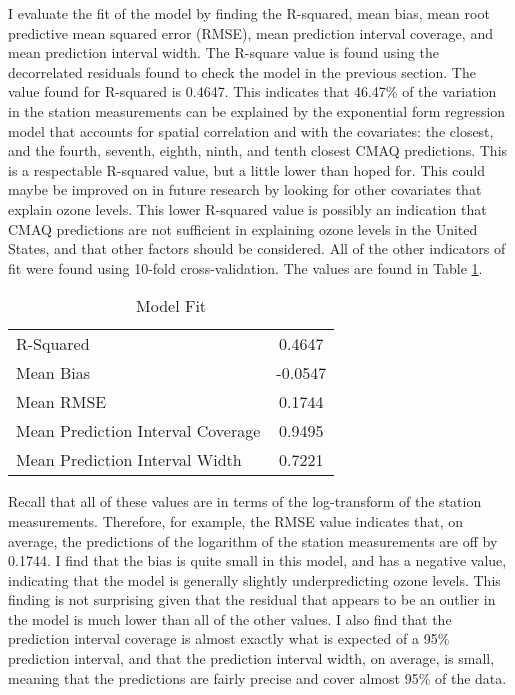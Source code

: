 \documentclass{svproc}
\begin{document}
I evaluate the fit of the model by finding the R-squared, mean bias, mean root predictive mean squared error (RMSE), mean prediction interval coverage, and mean prediction interval width. The R-square value is found using the decorrelated residuals found to check the model in the previous section. The value found for R-squared is 0.4647. This indicates that 46.47\% of the variation in the station measurements can be explained by the exponential form regression model that accounts for spatial correlation and with the covariates: the closest, and the fourth, seventh, eighth, ninth, and tenth closest CMAQ predictions. This is a respectable R-squared value, but a little lower than hoped for. This could maybe be improved on in future research by looking for other covariates that explain ozone levels. This lower R-squared value is possibly an indication that CMAQ predictions are not sufficient in explaining ozone levels in the United States, and that other factors should be considered. All of the other indicators of fit were found using 10-fold cross-validation. The values are found in Table \ref{fitvals}. 

\begin{table}[H]
\begin{center}
\caption{Model Fit}
\begin{tabular}{l | c }
\hline
R-Squared & 0.4647 \\
Mean Bias  &  -0.0547 \\
Mean RMSE & 0.1744 \\
{Mean Prediction Interval Coverage  } &  0.9495 \\
Mean Prediction Interval Width &  0.7221 \\
\hline
\end{tabular}
\label{fitvals}
\end{center}
\end{table}

Recall that all of these values are in terms of the log-transform of the station measurements. Therefore, for example, the RMSE value indicates that, on average, the predictions of the logarithm of the station measurements are off by 0.1744. I find that the bias is quite small in this model, and has a negative value, indicating that the model is generally slightly underpredicting ozone levels. This finding is not surprising given that the residual that appears to be an outlier in the model is much lower than all of the other values. I also find that the prediction interval coverage is almost exactly what is expected of a 95\% prediction interval, and that the prediction interval width, on average, is small, meaning that the predictions are fairly precise and cover almost 95\% of the data.
\end{document}
